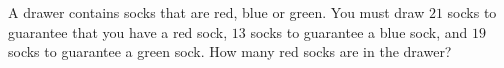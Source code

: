 A drawer contains socks that are red, blue or green. You must draw $21$ socks to guarantee that you have a red sock, $13$ socks to guarantee a blue sock, and $19$ socks to guarantee a green sock. How many red socks are in the drawer?
